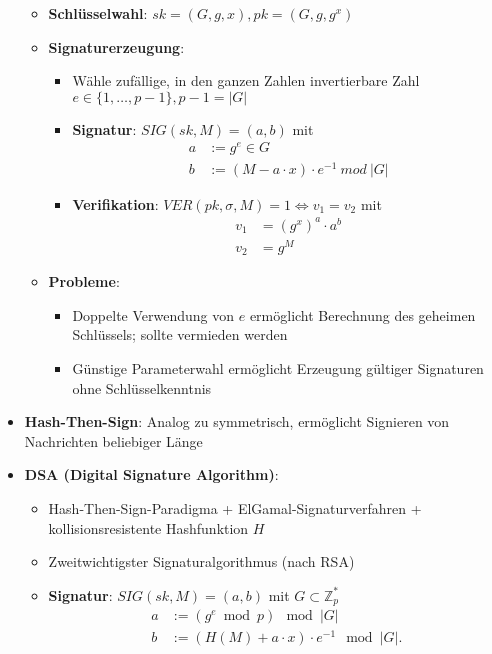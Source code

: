 \begin{itemize}
	\begin{itemize}
		\item \textbf{Schlüsselwahl}: $sk = (G, g, x), pk = (G, g, g^x)$
		\item \textbf{Signaturerzeugung}:
		\begin{itemize}
			\item Wähle zufällige, in den ganzen Zahlen invertierbare Zahl $e \in \{1, \dots, p - 1\}, p - 1 = |G|$
			\item \textbf{Signatur}: $SIG(sk, M) = (a, b)$ mit
			\begin{align*}
				a &:= g^e \in G\\
				b &:= (M - a \cdot x) \cdot e^{-1}\ mod\ |G|
			\end{align*}
			\item \textbf{Verifikation}: $VER(pk, \sigma, M) = 1 \Leftrightarrow v_1 = v_2$ mit
			\begin{align*}
				v_1 &= (g^x)^a \cdot a^b\\
				v_2 &= g^M
			\end{align*}
		\end{itemize}
		\item \textbf{Probleme}:
		\begin{itemize}
			\item Doppelte Verwendung von $e$ ermöglicht Berechnung des geheimen Schlüssels; sollte vermieden werden
			\item Günstige Parameterwahl ermöglicht Erzeugung gültiger  Signaturen ohne Schlüsselkenntnis
		\end{itemize}
	\end{itemize}
	\item \textbf{Hash-Then-Sign}: Analog zu symmetrisch, ermöglicht Signieren von Nachrichten beliebiger Länge
	\item \textbf{DSA (Digital Signature Algorithm)}:
	\begin{itemize}
		\item Hash-Then-Sign-Paradigma + ElGamal-Signaturverfahren + kollisionsresistente Hashfunktion $H$
		\item Zweitwichtigster Signaturalgorithmus (nach RSA)
		\item \textbf{Signatur}: $SIG(sk, M) = (a, b)$ mit $G \subset \mathbb{Z}_p^*$
		\begin{align*}
			a &:= (g^e \bmod p)\mod \left|G\right|\\
			b &:= (H(M) + a \cdot x) \cdot e^{-1} \mod \left|G\right|\text{.}
		\end{align*}

\end{itemize}
\end{itemize}
